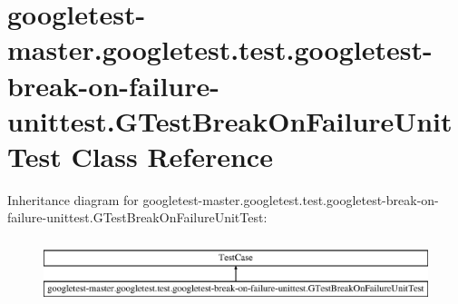\hypertarget{classgoogletest-master_1_1googletest_1_1test_1_1googletest-break-on-failure-unittest_1_1_g_test_break_on_failure_unit_test}{}\section{googletest-\/master.googletest.\+test.\+googletest-\/break-\/on-\/failure-\/unittest.G\+Test\+Break\+On\+Failure\+Unit\+Test Class Reference}
\label{classgoogletest-master_1_1googletest_1_1test_1_1googletest-break-on-failure-unittest_1_1_g_test_break_on_failure_unit_test}
Inheritance diagram for googletest-\/master.googletest.\+test.\+googletest-\/break-\/on-\/failure-\/unittest.G\+Test\+Break\+On\+Failure\+Unit\+Test\+:\begin{figure}[H]
\begin{center}
\leavevmode
\includegraphics[height=1.914530cm]{df/df9/classgoogletest-master_1_1googletest_1_1test_1_1googletest-break-on-failure-unittest_1_1_g_test_break_on_failure_unit_test}
\end{center}
\end{figure}
